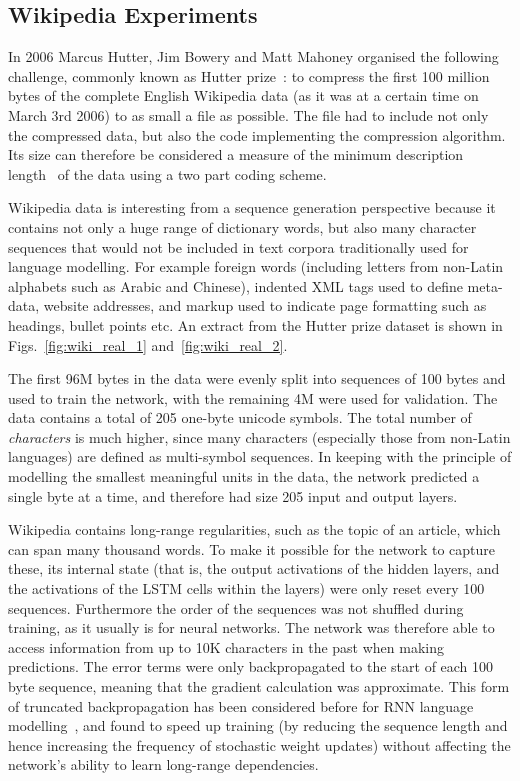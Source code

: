 \documentclass{article}
\begin{document}
\subsection{Wikipedia Experiments}
In 2006 Marcus Hutter, Jim Bowery and Matt Mahoney organised the following challenge, commonly known as Hutter prize~\cite{hutter06prize}: to compress the first 100 million bytes of the complete English Wikipedia data (as it was at a certain time on March 3rd 2006) to as small a file as possible.
The file had to include not only the compressed data, but also the code implementing the compression algorithm.
Its size can therefore be considered a measure of the minimum description length~\cite{grunwald07mdl} of the data using a two part coding scheme.

Wikipedia data is interesting from a sequence generation perspective because it contains not only a huge range of dictionary words, but also many character sequences that would not be included in text corpora traditionally used for language modelling.
For example foreign words (including letters from non-Latin alphabets such as Arabic and Chinese), indented XML tags used to define meta-data, website addresses, and markup used to indicate page formatting such as headings, bullet points etc.
An extract from the Hutter prize dataset is shown in Figs.~\ref{fig:wiki_real_1} and~\ref{fig:wiki_real_2}.

The first 96M bytes in the data were evenly split into sequences of 100 bytes and used to train the network, with the remaining 4M were used for validation.
The data contains a total of 205 one-byte unicode symbols.
The total number of \emph{characters} is much higher, since many characters (especially those from non-Latin languages) are defined as multi-symbol sequences.
In keeping with the principle of modelling the smallest meaningful units in the data, the network predicted a single byte at a time, and therefore had size 205 input and output layers.

Wikipedia contains long-range regularities, such as the topic of an article, which can span many thousand words.
To make it possible for the network to capture these, its internal state (that is, the output activations  of the hidden layers, and the activations  of the LSTM cells within the layers) were only reset every 100 sequences.
Furthermore the order of the sequences was not shuffled during training, as it usually is for neural networks.
The network was therefore able to access information from up to 10K characters in the past when making predictions.
The error terms were only backpropagated to the start of each 100 byte sequence, meaning that the gradient calculation was approximate.
This form of truncated backpropagation has been considered before for RNN language modelling~\cite{mikolov12thesis}, and found to speed up training (by reducing the sequence length and hence increasing the frequency of stochastic weight updates) without affecting the network's ability to learn long-range dependencies.
\end{document}
